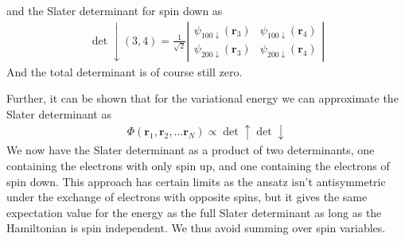 \documentclass[11pt]{article}
\begin{document}
			and the Slater determinant for spin down as
			\begin{align}
				\det\downarrow(3,4)=\frac{1}{\sqrt{2}}\left|\begin{array}{cc}
				\psi_{100\downarrow}(\mathbf{r}_{3}) & \psi_{100\downarrow}(\mathbf{r}_{4})\\
				\psi_{200\downarrow}(\mathbf{r}_{3}) & \psi_{200\downarrow}(\mathbf{r}_{4})
				\end{array}\right|
			\end{align}
			And the total determinant is of course still zero.

			Further, it can be shown that for the variational energy we can approximate
			the Slater determinant as
			\begin{align}
				\Phi(\mathbf{r}_{1},\mathbf{r}_{2},\dots\mathbf{r}_{N})\propto\det\uparrow\det\downarrow
			\end{align}
			We now have the Slater determinant as a product of two determinants,
			one containing the electrons with only spin up, and one containing
			the electrons of spin down. This approach has certain limits as the
			ansatz isn't antisymmetric under the exchange of electrons with opposite
			spins, but it gives the same expectation value for the energy as the
			full Slater determinant as long as the Hamiltonian is spin independent.
			We thus avoid summing over spin variables.
\end{document}
